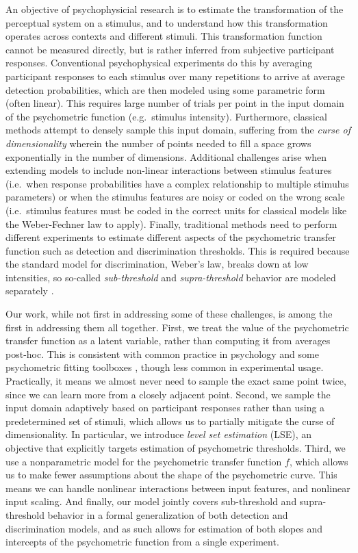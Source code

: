 \documentclass[../main.tex]{subfiles}
\begin{document}
An objective of psychophysicial research is to estimate the transformation of the perceptual system on a stimulus, and to understand how this transformation operates across contexts and different stimuli. This transformation function cannot be measured directly, but is rather inferred from subjective participant responses. Conventional psychophysical experiments do this by averaging participant responses to each stimulus over many repetitions to arrive at average detection probabilities, which are then modeled using some parametric form (often linear). This requires large number of trials per point in the input domain of the psychometric function (e.g.\ stimulus intensity). Furthermore, classical methods attempt to densely sample this input domain, suffering from the \emph{curse of dimensionality} wherein the number of points needed to fill a space grows exponentially in the number of dimensions. Additional challenges arise when extending models to include non-linear interactions between stimulus features (i.e.\ when response probabilities have a complex relationship to multiple stimulus parameters) or when the stimulus features are noisy or coded on the wrong scale (i.e.\ stimulus features must be coded in the correct units for classical models like the Weber-Fechner law to apply). Finally, traditional methods need to perform different experiments to estimate different aspects of the psychometric transfer function such as detection and discrimination thresholds. This is required because the standard model for discrimination, Weber's law, breaks down at low intensities, so so-called \emph{sub-threshold} and \emph{supra-threshold} behavior are modeled separately \citep[e.g.][]{Georgeson1975,Guan2016}.

Our work, while not first in addressing some of these challenges, is among the first in addressing them all together. First, we treat the value of the psychometric transfer function as a latent variable, rather than computing it from averages post-hoc. This is consistent with common practice in psychology and some psychometric fitting toolboxes \citep[e.g.]{Schutt2016}, though less common in experimental usage. Practically, it means we almost never need to sample the exact same point twice, since we can learn more from a closely adjacent point. Second, we sample the input domain adaptively based on participant responses rather than using a predetermined set of stimuli, which allows us to partially mitigate the curse of dimensionality. In particular, we introduce \emph{level set estimation} (LSE), an objective that explicitly targets estimation of psychometric thresholds. Third, we use a nonparametric model for the psychometric transfer function $f$, which allows us to make fewer assumptions about the shape of the psychometric curve. This means we can handle nonlinear interactions between input features, and nonlinear input scaling. And finally, our model jointly covers sub-threshold and supra-threshold behavior in a formal generalization of both detection and discrimination models, and as such allows for estimation of both slopes and intercepts of the psychometric function from a single experiment.
\end{document}

